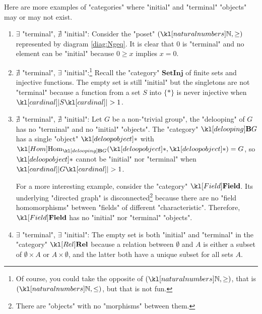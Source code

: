 \documentclass[main.tex]{subfiles}
\begin{document}
\begin{exmps}
	Here are more examples of "categories" where "initial" and "terminal" "objects" may or may not exist.
	\begin{enumerate}
		\begin{marginfigure}[3\baselineskip]
			\begin{equation}\label{diag:Ngeq}
				\begin{tikzcd}
				\stackrel{0}{\bullet}  & \arrow[l] \stackrel{1}{\bullet}  & \arrow[l] \stackrel{2}{\bullet}  & \arrow[l] \cdots
				\end{tikzcd}
			\end{equation}
		\end{marginfigure}
		\item $\exists$ "terminal", $\nexists$ "initial": Consider the "poset" $(\N, \geq)$ represented by diagram \eqref{diag:Ngeq}. It is clear that $0$ is "terminal" and no element can be "initial" because $0 \geq x$ implies $x = 0$.
		
		\item %
		$\nexists$ "terminal", $\exists$ "initial":\footnote{Of course, you could take the opposite of $(\N, \geq)$, that is $(\N, \leq)$, but that is not fun.} Recall the "category" $\mathbf{SetInj}$ of finite sets and injective functions. The empty set is still "initial" but the singletons are not "terminal" because a function from a set $S$ into $\{\ast\}$ is never injective when $\cardinal{S} > 1$.
		\item $\nexists$ "terminal", $\nexists$ "initial": Let $G$ be a non-"trivial group", the "delooping" of $G$ has no "terminal" and no "initial" "objects". The "category" $\deloop{G}$ has a single "object" $\deloopobject$ with $\Hom_{\deloop{G}}(\deloopobject, \deloopobject) = G$, so $\deloopobject$ cannot be "initial" nor "terminal" when $\cardinal{G} > 1$.
		
		For a more interesting example, consider the "category" $\catField$. Its underlying "directed graph" is disconnected\footnote{There are "objects" with no "morphisms" between them.} because there are no "field homomorphisms" between "fields" of different "characteristic". Therefore, $\catField$ has no "initial" nor "terminal" "objects".
		\item $\exists$ "terminal", $\exists$ "initial": The empty set is both "initial" and "terminal" in the "category" $\catRel$ because a relation between $\emptyset$ and $A$ is either a subset of $\emptyset \times A$ or $A \times \emptyset$, and the latter both have a unique subset for all sets $A$.
		

\end{enumerate}
\end{exmps}
\end{document}
